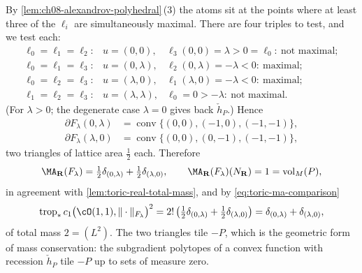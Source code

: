 \begin{example}
By \cref{lem:ch08-alexandrov-polyhedral}\,(3) the atoms sit at the points
where at least three of the $\ell_i$ are simultaneously maximal.  There are
four triples to test, and we test each:
\[
\begin{array}{lll}
 \ell_0=\ell_1=\ell_2:& u=(0,0),
  &\ell_3(0,0)=\lambda>0=\ell_0:\ \text{not maximal};\\
 \ell_0=\ell_1=\ell_3:& u=(0,\lambda),
  &\ell_2(0,\lambda)=-\lambda<0:\ \text{maximal};\\
 \ell_0=\ell_2=\ell_3:& u=(\lambda,0),
  &\ell_1(\lambda,0)=-\lambda<0:\ \text{maximal};\\
 \ell_1=\ell_2=\ell_3:& u=(\lambda,\lambda),
  &\ell_0=0>-\lambda:\ \text{not maximal}.
\end{array}
\]
(For $\lambda>0$; the degenerate case $\lambda=0$ gives back
$\check h_P$.)  Hence
\[
 \begin{aligned}
 \partial F_\lambda(0,\lambda)
   &=\operatorname{conv}\{(0,0),(-1,0),(-1,-1)\},\\
 \partial F_\lambda(\lambda,0)
   &=\operatorname{conv}\{(0,0),(0,-1),(-1,-1)\},
 \end{aligned}
\]
two triangles of lattice area $\tfrac12$ each.  Therefore
\[
 \MA_{\mathbf R}(F_\lambda)
 =\tfrac12\delta_{(0,\lambda)}+\tfrac12\delta_{(\lambda,0)},
 \qquad
 \MA_{\mathbf R}(F_\lambda)(N_{\mathbf R})=1=\operatorname{vol}_M(P) ,
\]
in agreement with \cref{lem:toric-real-total-mass}, and by
\eqref{eq:toric-ma-comparison}
\[
 \operatorname{trop}_*c_1\bigl(\cO(1,1),\|\cdot\|_{F_\lambda}\bigr)^2
 =2!\left(\tfrac12\delta_{(0,\lambda)}+\tfrac12\delta_{(\lambda,0)}\right)
 =\delta_{(0,\lambda)}+\delta_{(\lambda,0)} ,
\]
of total mass $2=(L^2)$.  The two triangles tile $-P$, which is the
geometric form of mass conservation: the subgradient polytopes of a convex
function with recession $\check h_P$ tile $-P$ up to sets of measure zero.
\end{example}

